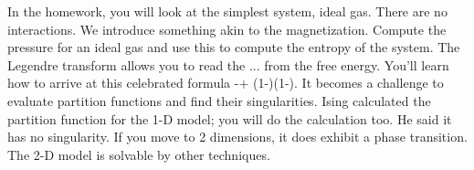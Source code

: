 In the homework, you will look at the simplest system, ideal gas. There are no interactions. We introduce something akin to the magnetization. Compute the pressure for an ideal gas and use this to compute the entropy of the system. The Legendre transform allows you to read the ... from the free energy. You'll learn how to arrive at this celebrated formula 
\be
-\rho\ln \rho + (1-\rho)\ln (1-\rho).
\ee
It becomes a challenge to evaluate partition functions and find their singularities. Ising calculated the partition function for the 1-D model; you will do the calculation too. He said it has no singularity. If you move to 2 dimensions, it does exhibit a phase transition. %
The 2-D model is solvable by other techniques.